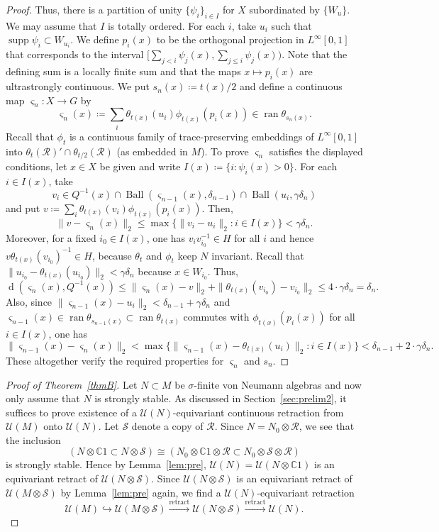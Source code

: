 \documentclass[12pt,nosumlimits,nonamelimits]{amsart}
\theoremstyle{remark}
\newcommand{\IC}{\mathbb{C}}
\newcommand{\cR}{\mathcal{R}}
\newcommand{\cS}{\mathcal{S}}
\newcommand{\cU}{\mathcal{U}}
\newcommand{\vs}{\varsigma}
\DeclareMathOperator{\ran}{ran}
\DeclareMathOperator{\supp}{supp}
\DeclareMathOperator{\dist}{d}
\DeclareMathOperator{\Ball}{Ball}
\begin{document}
\begin{proof}
Thus, there is a partition of unity $\{\psi_i\}_{i\in I}$ for $X$ 
subordinated by $\{ W_u\}$. 
We may assume that $I$ is totally ordered. 
For each $i$, take $u_i$ such that $\supp\psi_i\subset W_{u_i}$. 
We define $p_i(x)$ to be the orthogonal projection in $L^\infty[0,1]$ that 
corresponds to the interval $[\sum_{j<i}\psi_j(x), \sum_{j\le i}\psi_j(x))$. 
Note that the defining sum is a locally finite sum and that 
the maps $x\mapsto p_i(x)$ are ultrastrongly continuous. 
We put $s_n(x)\coloneqq t(x)/2$ and define 
a continuous map $\vs_n\colon X\to G$ by 
\[
\vs_n(x) \coloneqq \sum_i \theta_{t(x)}(u_i)\phi_{t(x)}(p_i(x)) \in \ran\theta_{s_n(x)}.
\]
Recall that $\phi_t$ is a continuous family of 
trace-preserving embeddings of $L^\infty[0,1]$ 
into $\theta_t(\cR)'\cap\theta_{t/2}(\cR)$ 
(as embedded in $M$). 
To prove $\vs_n$ satisfies the displayed conditions, 
let $x\in X$ be given and write $I(x)\coloneqq\{ i : \psi_i(x)>0\}$. 
For each $i\in I(x)$, take 
\[
v_i \in Q^{-1}(x) \cap \Ball(\vs_{n-1}(x), \delta_{n-1}) \cap \Ball(u_i, \gamma\delta_n) 
\]
and put $v\coloneqq\sum_i \theta_{t(x)}(v_i)\phi_{t(x)}(p_i(x))$. 
Then, 
\[
\| v- \vs_n(x) \|_2\le \max\{\| v_i-u_i\|_2 : i\in I(x)\}< \gamma\delta_n.
\]
Moreover, for a fixed $i_0\in I(x)$, one has  
$v_iv_{i_0}^{-1} \in H$ for all $i$ and 
hence $v\theta_{t(x)}(v_{i_0})^{-1}\in H$, because 
$\theta_t$ and $\phi_t$ keep $N$ invariant. 
Recall that $\| u_{i_0} - \theta_{t(x)}(u_{i_0})\|_2 < \gamma\delta_n$ because 
$x\in W_{i_0}$.
Thus, 
\[
\dist( \vs_n(x), Q^{-1}(x) ) \le \| \vs_n(x) - v \|_2 + \| \theta_{t(x)}(v_{i_0})-v_{i_0}\|_2
\le 4\cdot \gamma\delta_n=\delta_n.
\]
Also, since 
$\|  \vs_{n-1}(x) - u_i\|_2 < \delta_{n-1}+\gamma\delta_n$ and 
$\vs_{n-1}(x) \in \ran\theta_{s_{n-1}(x)}\subset \ran\theta_{t(x)}$ 
commutes with $\phi_{t(x)}(p_i(x))$ for all $i\in I(x)$,
one has 
\[
\|\vs_{n-1}(x)-\vs_n(x)\|_2<\max\{ \| \vs_{n-1}(x) - \theta_{t(x)}(u_i) \|_2 : i\in I(x) \}
 < \delta_{n-1}+2\cdot\gamma\delta_n.
\]
These altogether verify the required properties for $\vs_n$ and $s_n$. 
\end{proof}

\begin{proof}[Proof of Theorem~\ref{thmB}]
Let $N\subset M$ be $\sigma$-finite von Neumann algebras 
and now only assume that $N$ is strongly stable. 
As discussed in Section~\ref{sec:prelim2}, 
it suffices to prove existence of a $\cU(N)$-equivariant 
continuous retraction from $\cU(M)$ onto $\cU(N)$. 
Let $\cS$ denote a copy of $\cR$.
Since $N=N_0\otimes\cR$, we see that 
the inclusion 
\[
(N \otimes \IC1 \subset N\otimes\cS)
 \cong (N_0\otimes\IC1\otimes\cR\subset N_0\otimes\cS\otimes\cR)
\]
is strongly stable. 
Hence by Lemma~\ref{lem:pre}, $\cU(N)=\cU(N \otimes \IC1)$ 
is an equivariant retract of $\cU(N\otimes\cS)$. 
Since $\cU(N\otimes\cS)$ is an equivariant retract 
of $\cU(M\otimes\cS)$ by Lemma~\ref{lem:pre} again, 
we find a $\cU(N)$-equivariant retraction
\[
\cU(M) \hookrightarrow \cU(M\otimes\cS) \stackrel{\mathrm{retract}}{\to} \cU(N\otimes\cS)\stackrel{\mathrm{retract}}{\to}\cU(N).
\]
\vspace*{-1cm}

\end{proof}
\end{document}
